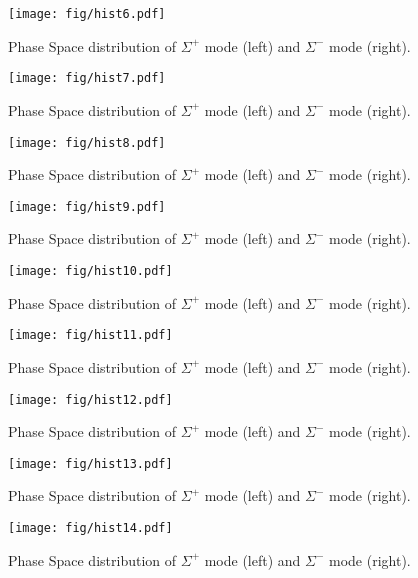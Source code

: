 \begin{figure}
\texttt{[image: fig/hist6.pdf]}
\caption{Phase Space distribution of $\Sigma^+$ mode (left) and $\Sigma^-$ mode (right).}
\end{figure}

\begin{figure}
\texttt{[image: fig/hist7.pdf]}
\caption{Phase Space distribution of $\Sigma^+$ mode (left) and $\Sigma^-$ mode (right).}
\end{figure}

\begin{figure}
\texttt{[image: fig/hist8.pdf]}
\caption{Phase Space distribution of $\Sigma^+$ mode (left) and $\Sigma^-$ mode (right).}
\end{figure}

\begin{figure}
\texttt{[image: fig/hist9.pdf]}
\caption{Phase Space distribution of $\Sigma^+$ mode (left) and $\Sigma^-$ mode (right).}
\end{figure}

\begin{figure}
\texttt{[image: fig/hist10.pdf]}
\caption{Phase Space distribution of $\Sigma^+$ mode (left) and $\Sigma^-$ mode (right).}
\end{figure}

\begin{figure}
\texttt{[image: fig/hist11.pdf]}
\caption{Phase Space distribution of $\Sigma^+$ mode (left) and $\Sigma^-$ mode (right).}
\end{figure}

\begin{figure}
\texttt{[image: fig/hist12.pdf]}
\caption{Phase Space distribution of $\Sigma^+$ mode (left) and $\Sigma^-$ mode (right).}
\end{figure}

\begin{figure}
\texttt{[image: fig/hist13.pdf]}
\caption{Phase Space distribution of $\Sigma^+$ mode (left) and $\Sigma^-$ mode (right).}
\end{figure}

\begin{figure}
\texttt{[image: fig/hist14.pdf]}
\caption{Phase Space distribution of $\Sigma^+$ mode (left) and $\Sigma^-$ mode (right).}
\end{figure}


